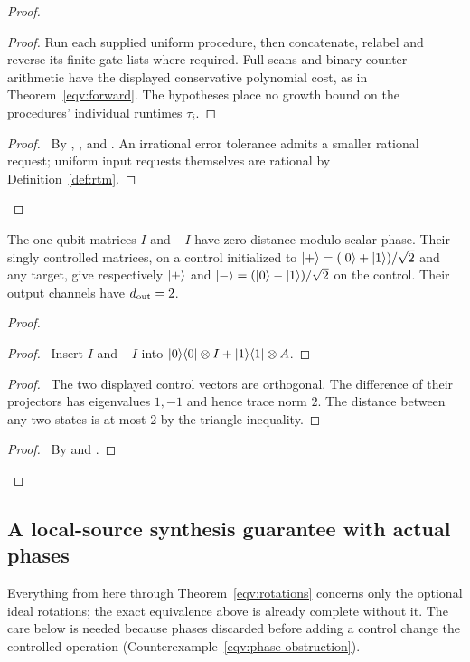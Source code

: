 \begin{proof}
\begin{proof}
Run each supplied uniform procedure, then
 concatenate, relabel and reverse its finite gate lists where
 required. Full scans and binary counter arithmetic have the
 displayed conservative polynomial cost, as in
 Theorem~\ref{eqv:forward}. The hypotheses place no growth bound
 on the procedures' individual runtimes $\tau_i$.\end{proof}
 \qedstep
 \begin{proof}\pf\ By ,
 , and .
 An irrational error tolerance admits a smaller rational request;
 uniform input requests themselves are rational by
 Definition~\ref{def:rtm}.\end{proof}
\end{proof}

\begin{counterexample}
\label{eqv:phase-obstruction}
The one-qubit matrices $I$ and $-I$ have zero distance modulo scalar
phase. Their singly controlled matrices, on a control initialized to
$\lvert +\rangle=(\lvert 0\rangle+\lvert 1\rangle)/\sqrt2$ and any target, give respectively
$\lvert +\rangle$ and $\lvert -\rangle=(\lvert 0\rangle-\lvert 1\rangle)/\sqrt2$ on the control. Their
output channels have $d_{\rm out}=2$.
\end{counterexample}
\begin{proof}
 \begin{proof}\pf\ Insert $I$ and $-I$ into
 $\lvert 0\rangle\langle 0\rvert\otimes I+\lvert 1\rangle\langle 1\rvert\otimes A$.\end{proof}
 \begin{proof}\pf\ The two displayed control vectors are
 orthogonal. The difference of their projectors has eigenvalues
 $1,-1$ and hence trace norm $2$. The distance between any two
 states is at most $2$ by the triangle inequality.\end{proof}
 \qedstep
 \begin{proof}\pf\ By  and
 .\end{proof}
\end{proof}

\subsection{A local-source synthesis guarantee with actual phases}
Everything from here through Theorem~\ref{eqv:rotations} concerns only
the optional ideal rotations; the exact equivalence above is already
complete without it. The care below is needed because phases discarded
before adding a control change the controlled operation
(Counterexample~\ref{eqv:phase-obstruction}).


